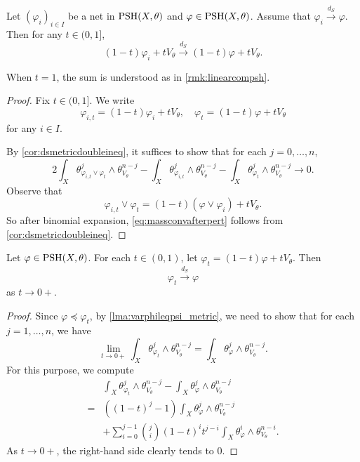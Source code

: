 \begin{lemma}\label{lma:dsconvpertV}
    Let $(\varphi_i)_{i\in I}$ be a net in $\mathrm{PSH}(X,\theta)$ and $\varphi\in \mathrm{PSH}(X,\theta)$. Assume that $\varphi_i\xrightarrow{d_S}\varphi$. Then for any $t\in (0,1]$,
    \[
    (1-t)\varphi_i+ tV_{\theta}\xrightarrow{d_S}(1-t)\varphi+ tV_{\theta}.
    \]
\end{lemma}
 When $t=1$, the sum is understood as in \cref{rmk:linearcompsh}.
\begin{proof}
    Fix $t\in (0,1]$. We write
    \[
    \varphi_{i,t}=(1-t)\varphi_i+ tV_{\theta},\quad \varphi_t=(1-t)\varphi+ tV_{\theta}
    \]
    for any $i\in I$.

    By \cref{cor:dsmetricdoubleineq}, it suffices to show that for each $j=0,\ldots,n$,
    \begin{equation}\label{eq:massconvafterpert}
    2\int_X \theta_{\varphi_{i,t}\lor \varphi_t}^j\wedge \theta_{V_{\theta}}^{n-j}-\int_X \theta_{\varphi_{i,t}}^j\wedge \theta_{V_{\theta}}^{n-j}-\int_X \theta_{\varphi_t}^j\wedge \theta_{V_{\theta}}^{n-j}\to 0.
    \end{equation}
    Observe that
    \[
    \varphi_{i,t}\lor \varphi_t=(1-t)(\varphi\lor \varphi_i)+t V_{\theta}.
    \]
    So after binomial expansion, \eqref{eq:massconvafterpert} follows from \cref{cor:dsmetricdoubleineq}.
\end{proof}

\begin{lemma}\label{lma:linearpertbyVtheta}
    Let $\varphi\in \mathrm{PSH}(X,\theta)$. For each $t\in (0,1)$, let $\varphi_t=(1-t)\varphi+t V_{\theta}$. Then
    \[
        \varphi_t\xrightarrow{d_S}\varphi
    \]
    as $t\to 0+$.
\end{lemma}
\begin{proof}
    Since $\varphi\preceq\varphi_t$, by \cref{lma:varphileqpsi_metric}, we need to show that for each $j=1,\dots,n$, we have
    \[
        \lim_{t\to 0+} \int_X \theta_{\varphi_t}^j\wedge \theta_{V_{\theta}}^{n-j}=\int_X \theta_{\varphi}^j\wedge \theta_{V_{\theta}}^{n-j}.
    \]
    For this purpose, we compute
    \[
        \begin{aligned}
            & \int_X \theta_{\varphi_t}^j\wedge \theta_{V_{\theta}}^{n-j}- \int_X \theta_{\varphi}^j\wedge \theta_{V_{\theta}}^{n-j}\\
            =&\left((1-t)^j-1\right)\int_X \theta_{\varphi}^j\wedge \theta_{V_{\theta}}^{n-j}\\
            &+\sum_{i=0}^{j-1} \binom{j}{i}(1-t)^i t^{j-i}\int_X\theta_{\varphi}^i\wedge \theta_{V_{\theta}}^{n-i}.
        \end{aligned}
    \]
    As $t\to 0+$, the right-hand side clearly tends to $0$.
\end{proof}


